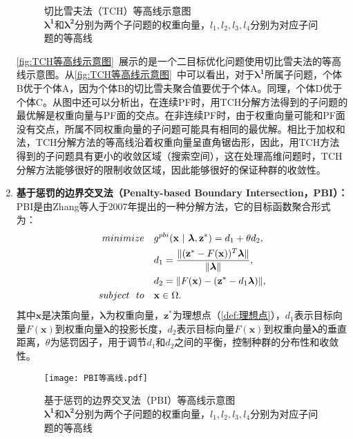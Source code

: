 \begin{enumerate}
\begin{figure}[htb]
        \caption[切比雪夫法（TCH）等高线示意图]{切比雪夫法（TCH）等高线示意图 \\ $\boldsymbol{\lambda^1}$和$\boldsymbol{\lambda^2}$分别为两个子问题的权重向量，$l_1, l_2, l_3, l_4$分别为对应子问题的等高线}
        \label{fig:TCH等高线示意图}
    \end{figure}
    \par
    \autoref{fig:TCH等高线示意图}~展示的是一个二目标优化问题使用切比雪夫法的等高线示意图。从\autoref{fig:TCH等高线示意图}~中可以看出，对于$\boldsymbol{\lambda^1}$所属子问题，个体B优于个体A，因为个体B的切比雪夫聚合值要优于个体A。同理，个体D优于个体C。从图中还可以分析出，在连续PF时，用TCH分解方法得到的子问题的最优解是权重向量与PF面的交点。在非连续PF时，由于权重向量可能和PF面没有交点，所属不同权重向量的子问题可能具有相同的最优解。相比于加权和法，TCH分解方法的等高线沿着权重向量呈直角锯齿形，因此，用TCH方法得到的子问题具有更小的收敛区域（搜索空间），这在处理高维问题时，TCH分解方法能够很好的限制收敛区域，因此能够很好的保证种群的收敛性。
    \item \textbf{基于惩罚的边界交叉法（Penalty-based Boundary Intersection，PBI）：}PBI是由Zhang等人于2007年提出的一种分解方法\cite{zhang2007moea}，它的目标函数聚合形式为：
    \begin{align}
        \label{eq:PBI}
        minimize \quad & g^{pbi}(\mathbf{x} \ | \ \boldsymbol{\lambda},\mathbf{z}^*) = d_1 + \theta d_2, \\
        & d_1 = \frac{\| (\mathbf{z}^* - F(\mathbf{x}))^T \boldsymbol{\lambda} \Vert }{ \|  \boldsymbol{\lambda} \Vert }, \notag\\
        & d_2 = \| F(\mathbf{x}) - (\mathbf{z}^* - d_1 \boldsymbol{\lambda}) \Vert, \notag \\
        subject \ \ to \quad & \mathbf{x} \in \Omega. \notag
    \end{align}
    其中$\mathbf{x}$是决策向量，$\boldsymbol{\lambda}$为权重向量，$\mathbf{z}^*$为理想点（\autoref{def:理想点}），$d_1$表示目标向量$F(\mathbf{x})$到权重向量$\boldsymbol{\lambda}$的投影长度，$d_2$表示目标向量$F(\mathbf{x})$到权重向量$\boldsymbol{\lambda}$的垂直距离，$\theta$为惩罚因子，用于调节$d_1$和$d_2$之间的平衡，控制种群的分布性和收敛性。
    \par
    \begin{figure}[htb]
        \texttt{[image: PBI等高线.pdf]}
        \caption[基于惩罚的边界交叉法（PBI）等高线示意图]{基于惩罚的边界交叉法（PBI）等高线示意图 \\ $\boldsymbol{\lambda^1}$和$\boldsymbol{\lambda^2}$分别为两个子问题的权重向量，$l_1, l_2, l_3, l_4$分别为对应子问题的等高线}

\end{figure}
\end{enumerate}
